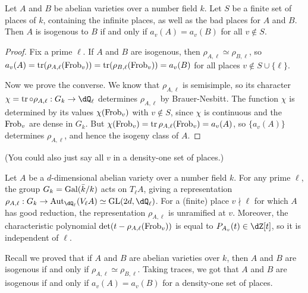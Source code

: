\begin{theorem}
Let $A$ and $B$ be abelian varieties over a number field $k$. Let $S$ be a
finite set of places of $k$, containing the infinite places, as well as the 
bad places for $A$ and $B$. Then $A$ is isogenous to $B$ if and only if 
$a_v(A)=a_v(B)$ for all $v\notin S$. 
\end{theorem}
\begin{proof}
Fix a prime $\ell$. If $A$ and $B$ are isogenous, then 
$\rho_{A,\ell}\simeq \rho_{B,\ell}$, so 
$a_v(A)=\operatorname{tr}(\rho_{A,\ell}(\mathrm{Frob}_v))=\operatorname{tr}(\rho_{B,\ell}(\mathrm{Frob}_v))=a_v(B)$ 
for all places $v\notin S\cup\{\ell\}$. 

Now we prove the converse. We know that $\rho_{A,\ell}$ is semisimple, so its 
character $\chi=\trace\circ \rho_{A,\ell}:G_k \to \dQ_\ell$ determines 
$\rho_{A,\ell}$ by Brauer-Nesbitt. The function $\chi$ is determined by its 
values $\chi(\mathrm{Frob}_v)$ with $v\notin S$, since $\chi$ is continuous and the 
$\mathrm{Frob}_v$ are dense in $G_k$. But 
$\chi(\mathrm{Frob}_v)=\operatorname{tr} \rho_{A,\ell}(\mathrm{Frob}_v) = a_v(A)$, so $\{a_v(A)\}$ 
determines $\rho_{A,\ell}$, and hence the isogeny class of $A$. 
\end{proof}

(You could also just say all $v$ in a density-one set of places.) 






Let $A$ be a $d$-dimensional abelian variety over a number field $k$. For any 
prime $\ell$, the group $G_k=\operatorname{Gal}(\bar k/k)$ acts on $T_\ell A$, giving a 
representation 
$\rho_{A,\ell}:G_k \to \aut_{\dQ_\ell}(V_\ell A) \simeq \gl{2 d}{\dQ_\ell}$. 
For a (finite) place $v\nmid \ell$ for which $A$ has good reduction, the 
representation $\rho_{A,\ell}$ is unramified at $v$. Moreover, the 
characteristic polynomial $\det(t-\rho_{A,\ell}(\mathrm{Frob}_v))$ is equal to 
$P_{A_v}(t)\in \dZ[t]$, so it is independent of $\ell$. 

Recall we proved that if $A$ and $B$ are abelian varieties over $k$, then 
$A$ and $B$ are isogenous if and only if $\rho_{A,\ell}\simeq \rho_{B,\ell}$. 
Taking traces, we got that $A$ and $B$ are isogenous if and only if 
$a_v(A)=a_v(B)$ for a density-one set of places. 

